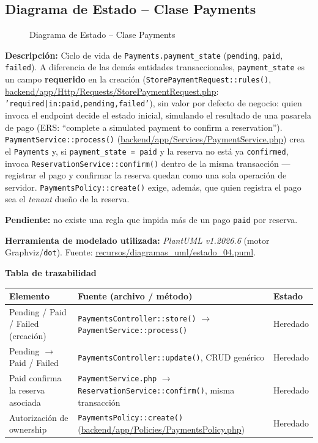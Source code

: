\subsection{Diagrama de Estado -- Clase Payments}
\begin{figure}[H]
    \centering
    \caption{Diagrama de Estado -- Clase Payments}
    \label{fig:estado04}
\end{figure}

{\sloppy\noindent\textbf{Descripción:} Ciclo de vida de \texttt{Payments.payment\_state} (\texttt{pending}, \texttt{paid}, \texttt{failed}). A diferencia de las demás entidades transaccionales, \texttt{payment\_state} es un campo \textbf{requerido} en la creación (\texttt{StorePaymentRequest::rules()}, \url{backend/app/Http/Requests/StorePaymentRequest.php}: \texttt{'required|in:paid,pending,failed'}), sin valor por defecto de negocio: quien invoca el endpoint decide el estado inicial, simulando el resultado de una pasarela de pago (ERS: ``complete a simulated payment to confirm a reservation''). \texttt{PaymentService::process()} (\url{backend/app/Services/PaymentService.php}) crea el \texttt{Payments} y, si \texttt{payment\_state = paid} y la reserva no está ya \texttt{confirmed}, invoca \texttt{ReservationService::confirm()} dentro de la misma transacción --- registrar el pago y confirmar la reserva quedan como una sola operación de servidor. \texttt{PaymentsPolicy::create()} exige, además, que quien registra el pago sea el \textit{tenant} dueño de la reserva.\par}

\noindent\textbf{Pendiente:} no existe una regla que impida más de un pago \texttt{paid} por reserva.

\bigskip
{\sloppy\noindent\textbf{Herramienta de modelado utilizada:} \textit{PlantUML v1.2026.6} (motor Graphviz/\texttt{dot}). Fuente: \url{recursos/diagramas_uml/estado_04.puml}.\par}

\bigskip
\noindent\textbf{Tabla de trazabilidad}
\begin{longtable}{|L{4cm}|L{7.5cm}|M{2.3cm}|}
\hline
{} \textbf{Elemento} & \textbf{Fuente (archivo / método)} & \textbf{Estado} \\ \hline
\endhead
Pending / Paid / Failed (creación) & \texttt{PaymentsController::store()} $\to$ \texttt{PaymentService::process()} & Heredado \\ \hline
Pending $\to$ Paid / Failed & \texttt{PaymentsController::update()}, CRUD genérico & Heredado \\ \hline
Paid confirma la reserva asociada & \texttt{PaymentService.php} $\to$ \texttt{ReservationService::confirm()}, misma transacción & Heredado \\ \hline
Autorización de ownership & \texttt{PaymentsPolicy::create()} (\url{backend/app/Policies/PaymentsPolicy.php}) & Heredado \\ \hline
\end{longtable}
\clearpage

